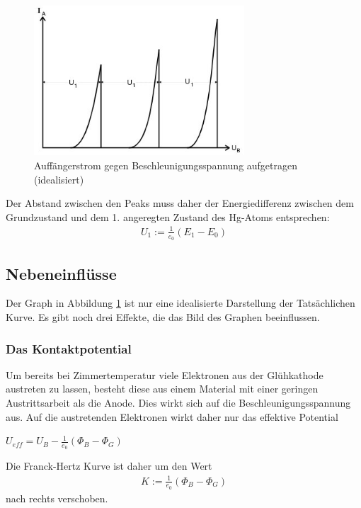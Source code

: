 \begin{figure}[H]
\includegraphics[width=0.7\textwidth]{pics/strom_spannung.jpeg}
\caption{Auffängerstrom gegen Beschleunigungsspannung aufgetragen (idealisiert)}
\label{pic_strom_spannung}
\end{figure}
Der Abstand zwischen den Peaks muss daher der Energiedifferenz zwischen dem Grundzustand und dem 1. angeregten Zustand des Hg-Atoms entsprechen:
\begin{align}
U_1:= \frac{1}{e_0}(E_1-E_0)
\end{align}
\subsection{Nebeneinflüsse}
Der Graph in Abbildung \ref{pic_strom_spannung} ist nur eine idealisierte Darstellung der Tatsächlichen Kurve. Es gibt noch drei Effekte, die das Bild des Graphen beeinflussen.
\subsubsection{Das Kontaktpotential}
Um bereits bei Zimmertemperatur viele Elektronen aus der Glühkathode austreten zu lassen, besteht diese aus einem Material mit einer geringen Austrittsarbeit als die Anode. Dies wirkt sich auf die Beschleunigungsspannung aus. Auf die austretenden Elektronen wirkt daher nur das effektive Potential
\begin{formel}[H]
\centering
$U_{eff}= U_B - \frac{1}{e_0}(\Phi_B-\Phi_G)$
\caption*{\small{$\Phi_G$ - Austrittsarbeit Glühdrat, $\Phi_B$ - Austrittsarbeit Beschleunigungselektrode}}
\end{formel}
Die Franck-Hertz Kurve ist daher um den Wert
\begin{align}
K:=\frac{1}{e_0}(\Phi_B-\Phi_G)
\end{align}
nach rechts verschoben.
